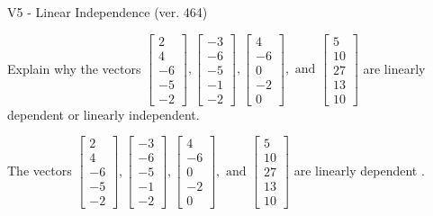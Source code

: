 \begin{exercise}
  \begin{exerciseTitle}V5 - Linear Independence (ver. 464)\end{exerciseTitle}
  \begin{exerciseStatement}
    Explain why the vectors \(\left[\begin{array}{r}
2 \\
4 \\
-6 \\
-5 \\
-2
\end{array}\right] , \left[\begin{array}{r}
-3 \\
-6 \\
-5 \\
-1 \\
-2
\end{array}\right] , \left[\begin{array}{r}
4 \\
-6 \\
0 \\
-2 \\
0
\end{array}\right] , \text{ and } \left[\begin{array}{r}
5 \\
10 \\
27 \\
13 \\
10
\end{array}\right]\) are linearly dependent or linearly independent.	


  \end{exerciseStatement}
  \begin{exerciseAnswer}
   The vectors \(\left[\begin{array}{r}
2 \\
4 \\
-6 \\
-5 \\
-2
\end{array}\right] , \left[\begin{array}{r}
-3 \\
-6 \\
-5 \\
-1 \\
-2
\end{array}\right] , \left[\begin{array}{r}
4 \\
-6 \\
0 \\
-2 \\
0
\end{array}\right] , \text{ and } \left[\begin{array}{r}
5 \\
10 \\
27 \\
13 \\
10
\end{array}\right]\) are 
  	 linearly dependent  .
  


  \end{exerciseAnswer}
\end{exercise}